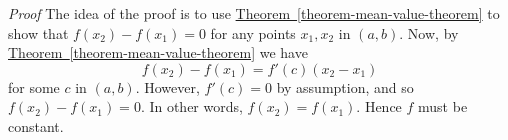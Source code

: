 \documentclass[10pt,]{book}
\makeatletter
\theoremstyle{ptxplainnotitle}
\theoremstyle{ptxplaintitle}
\theoremstyle{ptxplainnotitle}
\theoremstyle{ptxplaintitle}
\theoremstyle{ptxplainnotitle}
\theoremstyle{ptxplaintitle}
\renewcommand*{\proofname}{Proof}
\renewenvironment{proof}[1][\proofname]{\par
  \pushQED{\qed}%
  \normalfont \topsep6\p@\@plus6\p@\relax
  \trivlist
  \item\relax
    {\itshape
    #1\@addpunct{.}}\hspace\labelsep\ignorespaces
}{%
  \popQED\endtrivlist\@endpefalse
}
\theoremstyle{ptxdefinitionnotitle}
\theoremstyle{ptxdefinitiontitle}
\theoremstyle{ptxdefinitionnotitle}
\theoremstyle{ptxdefinitiontitle}
\theoremstyle{ptxdefinitionnotitle}
\theoremstyle{ptxdefinitiontitle}
\theoremstyle{ptxdefinitionnotitle}
\theoremstyle{ptxdefinitiontitle}
\theoremstyle{ptxdefinitionnotitle}
\theoremstyle{ptxdefinitiontitle}
\numberwithin{equation}{section}
\makeatother
\begin{document}
\begin{proof}\hypertarget{proof-8}{}
\hypertarget{p-345}{}%
The idea of the proof is to use \hyperref[theorem-mean-value-theorem]{Theorem~\ref{theorem-mean-value-theorem}} to show that \(f(x_{2}) - f(x_{1}) = 0\) for any points \(x_{1},x_{2}\) in \((a,b)\). Now, by \hyperref[theorem-mean-value-theorem]{Theorem~\ref{theorem-mean-value-theorem}} we have%
\begin{equation*}
f(x_{2}) - f(x_{1}) = f'(c)(x_{2}-x_{1})
\end{equation*}
for some \(c\) in \((a,b)\). However, \(f'(c) = 0\) by assumption, and so \(f(x_{2}) - f(x_{1}) = 0\). In other words, \(f(x_{2}) = f(x_{1})\). Hence \(f\) must be constant.%
\end{proof}
\typeout{************************************************}
\typeout{************************************************}
\end{document}
